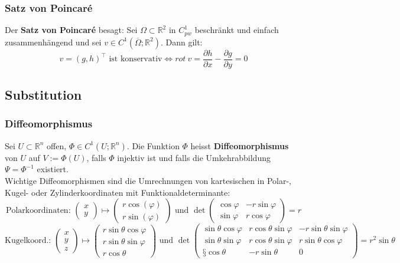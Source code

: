 \documentclass[a4paper,10pt]{scrartcl}
\begin{document}
\subsubsection{Satz von Poincaré}
Der \textbf{Satz von Poincaré} besagt: 
Sei $\Omega\subset \mathbb{R}^2$ in $C^1_{pw}$ beschränkt und einfach zusammenhängend und sei $v\in C^1(\overline{\Omega};\mathbb{R}^2)$. Dann gilt: 
\begin{equation}
	v= (g,h)^\top \text{ ist konservativ} \Leftrightarrow rot \ v = \frac{\partial h}{\partial x} - \frac{\partial g}{\partial y} = 0
\end{equation}
\subsection{Substitution}
\subsubsection{Diffeomorphismus}
Sei $U\subset \mathbb{R}^n$ offen, $\Phi\in C^1(U;\mathbb{R}^n)$. Die Funktion $\Phi$ heisst \textbf{Diffeomorphismus} von $U$ auf $V:=\Phi(U)$, falls $\Phi$ injektiv ist und falls die Umkehrabbildung $\Psi=\Phi^{-1}$ existiert.\\
Wichtige Diffeomorphismen sind die Umrechnungen von kartesischen in Polar-, Kugel- oder Zylinderkoordinaten mit Funktionaldeterminante: 
\begin{equation}
	\text{Polarkoordinaten: }
	\begin{pmatrix}
	x\\y
	\end{pmatrix}
	\mapsto
	\begin{pmatrix}
	r\cos(\varphi)\\
	r\sin(\varphi)
	\end{pmatrix}
	\text{ und }
	\det
	\begin{pmatrix}
	\cos \varphi & -r\sin\varphi\\
	\sin \varphi & r\cos\varphi
	\end{pmatrix}
	=r
\end{equation}
\begin{equation}
\text{Kugelkoord.: }
\begin{pmatrix}
x\\y\\z
\end{pmatrix}
\mapsto
\begin{pmatrix}
r\sin\theta\cos\varphi\\
r\sin\theta\sin\varphi\\
r\cos\theta
\end{pmatrix}
\text{ und }
\det
\begin{pmatrix}
\sin\theta\cos \varphi & r\cos\theta\sin\varphi & -r\sin\theta\sin\varphi\\
\sin\theta\sin \varphi & r\cos\theta\sin\varphi & r\sin\theta\cos\varphi \\
§\cos\theta&-r\sin\theta & 0
\end{pmatrix}
=r^2\sin\theta
\end{equation}
\end{document}
